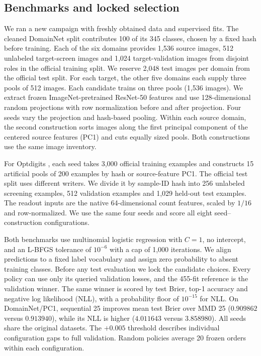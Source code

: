 \subsection{Benchmarks and locked selection}
\label{app:fresh-protocol}
We ran a new campaign with freshly obtained data and supervised fits. The cleaned DomainNet split contributes 100 of its 345 classes, chosen by a fixed hash before training. Each of the six domains provides 1,536 source images, 512 unlabeled target-screen images and 1,024 target-validation images from disjoint roles in the official training split. We reserve 2,048 test images per domain from the official test split. For each target, the other five domains each supply three pools of 512 images. Each candidate trains on three pools (1,536 images). We extract frozen ImageNet-pretrained ResNet-50 features and use 128-dimensional random projections with row normalization before and after projection. Four seeds vary the projection and hash-based pooling. Within each source domain, the second construction sorts images along the first principal component of the centered source features (PC1) and cuts equally sized pools. Both constructions use the same image inventory.

For Optdigits \citep{alpaydin1998optdigits}, each seed takes 3,000 official training examples and constructs 15 artificial pools of 200 examples by hash or source-feature PC1. The official test split uses different writers. We divide it by sample-ID hash into 256 unlabeled screening examples, 512 validation examples and 1,029 held-out test examples. The readout inputs are the native 64-dimensional count features, scaled by $1/16$ and row-normalized. We use the same four seeds and score all eight seed--construction configurations.

Both benchmarks use multinomial logistic regression with $C=1$, no intercept, and an L-BFGS tolerance of $10^{-6}$ with a cap of 1,000 iterations. We align predictions to a fixed label vocabulary and assign zero probability to absent training classes. Before any test evaluation we lock the candidate choices. Every policy can use only its queried validation losses, and the 455-fit reference is the validation winner. The same winner is scored by test Brier, top-1 accuracy and negative log likelihood (NLL), with a probability floor of $10^{-15}$ for NLL. On DomainNet/PC1, sequential 25 improves mean test Brier over MMD 25 ($0.909862$ versus $0.913940$), while its NLL is higher ($4.011643$ versus $3.858980$). All seeds share the original datasets. The $+0.005$ threshold describes individual configuration gaps to full validation. Random policies average 20 frozen orders within each configuration.

